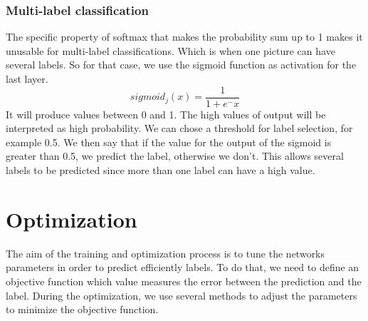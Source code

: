 \subsubsection{Multi-label classification}
The specific property of softmax that makes the probability sum up to 1 makes it unusable for multi-label classifications. Which is when one picture can have several labels. So for that case, we use the sigmoid function as activation for the last layer.\[sigmoid_j(x) = \frac{1}{1 + e^-x} \] It will produce values between 0 and 1. The high values of output will be interpreted as high probability. We can chose a threshold for label selection, for example 0.5. We then say that if the value for the output of the sigmoid is greater than 0.5, we predict the label, otherwise we don't. This allows several labels to be predicted since more than one label can have a high value. 

\section{Optimization}
The aim of the training and optimization process is to tune the networks parameters in order to predict efficiently labels. To do that, we need to define an objective function which value measures the error between the prediction and the label. During the optimization, we use several methods to adjust the parameters to minimize the objective function.

